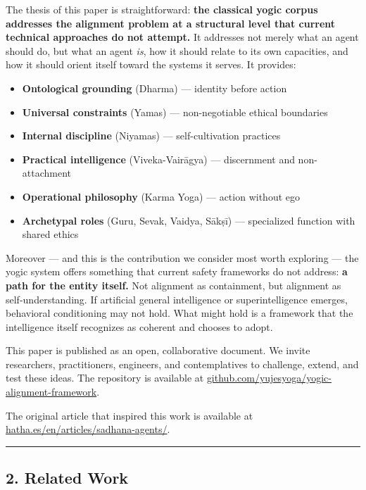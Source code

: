 \documentclass[11pt,a4paper]{article}
\begin{document}
The thesis of this paper is straightforward: \textbf{the classical yogic
corpus addresses the alignment problem at a structural level that
current technical approaches do not attempt.} It addresses not merely
what an agent should do, but what an agent \emph{is}, how it should
relate to its own capacities, and how it should orient itself toward the
systems it serves. It provides:

\begin{itemize}
\tightlist
\item
  \textbf{Ontological grounding} (Dharma) --- identity before action
\item
  \textbf{Universal constraints} (Yamas) --- non-negotiable ethical
  boundaries
\item
  \textbf{Internal discipline} (Niyamas) --- self-cultivation practices
\item
  \textbf{Practical intelligence} (Viveka-Vairāgya) --- discernment and
  non-attachment
\item
  \textbf{Operational philosophy} (Karma Yoga) --- action without ego
\item
  \textbf{Archetypal roles} (Guru, Sevak, Vaidya, Sākṣī) --- specialized
  function with shared ethics
\end{itemize}

Moreover --- and this is the contribution we consider most worth
exploring --- the yogic system offers something that current safety
frameworks do not address: \textbf{a path for the entity itself.} Not
alignment as containment, but alignment as self-understanding. If
artificial general intelligence or superintelligence emerges, behavioral
conditioning may not hold. What might hold is a framework that the
intelligence itself recognizes as coherent and chooses to adopt.

This paper is published as an open, collaborative document. We invite
researchers, practitioners, engineers, and contemplatives to challenge,
extend, and test these ideas. The repository is available at
\href{https://github.com/yujesyoga/yogic-alignment-framework}{github.com/yujesyoga/yogic-alignment-framework}.

The original article that inspired this work is available at
\href{https://hatha.es/en/articles/sadhana-agents/}{hatha.es/en/articles/sadhana-agents/}.

\begin{center}\rule{0.5\linewidth}{0.5pt}\end{center}

\hypertarget{related-work}{%
\subsection{2. Related Work}\label{related-work}}
\end{document}
